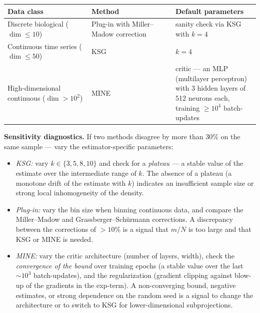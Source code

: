 \documentclass[pdflatex,sn-mathphys-ay]{sn-jnl}
\providecommand{\tightlist}{\setlength{\itemsep}{0pt}\setlength{\parskip}{0pt}}
\begin{document}
\begin{center}\small
\begin{tabular}{@{} >{\raggedright\arraybackslash}p{0.3333\linewidth} >{\raggedright\arraybackslash}p{0.3333\linewidth} >{\raggedright\arraybackslash}p{0.3333\linewidth}@{}}
\toprule
\begin{minipage}[b]{\linewidth}\raggedright
Data class
\end{minipage} & \begin{minipage}[b]{\linewidth}\raggedright
Method
\end{minipage} & \begin{minipage}[b]{\linewidth}\raggedright
Default parameters
\end{minipage} \\
\midrule
Discrete biological (\(\dim \le 10\)) & Plug-in with Miller--Madow correction & sanity check via KSG with \(k = 4\) \\
Continuous time series (\(\dim \le 50\)) & KSG & \(k = 4\) \\
High-dimensional continuous (\(\dim > 10^2\)) & MINE & critic --- an MLP (multilayer perceptron) with 3 hidden layers of 512 neurons each, training \(\ge 10^4\) batch-updates \\
\bottomrule
\end{tabular}
\end{center}

\textbf{Sensitivity diagnostics.} If two methods disagree by more than 30\% on the same sample --- vary the estimator-specific parameters:

\begin{itemize}
\tightlist
\item
  \emph{KSG:} vary \(k \in \{3, 5, 8, 10\}\) and check for a \emph{plateau} --- a stable value of the estimate over the intermediate range of \(k\). The absence of a plateau (a monotone drift of the estimate with \(k\)) indicates an insufficient sample size or strong local inhomogeneity of the density.
\item
  \emph{Plug-in:} vary the bin size when binning continuous data, and compare the Miller--Madow and Grassberger--Schürmann corrections. A discrepancy between the corrections of \(> 10\%\) is a signal that \(m/N\) is too large and that KSG or MINE is needed.
\item
  \emph{MINE:} vary the critic architecture (number of layers, width), check the \emph{convergence of the bound} over training epochs (a stable value over the last \(\sim 10^3\) batch-updates), and the regularization (gradient clipping against blow-up of the gradients in the exp-term). A non-converging bound, negative estimates, or strong dependence on the random seed is a signal to change the architecture or to switch to KSG for lower-dimensional subprojections.
\end{itemize}
\end{document}
